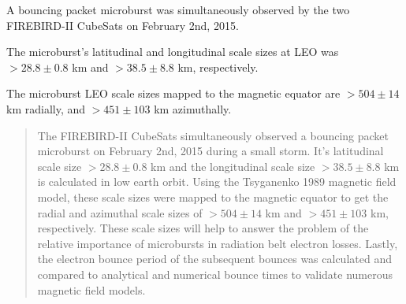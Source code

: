 \documentclass[draft,linenumbers]{agujournal}
\begin{document}





\begin{keypoints}
\item A bouncing packet microburst was simultaneously observed by the two FIREBIRD-II CubeSats on February 2nd, 2015.
\item The microburst's latitudinal and longitudinal scale sizes at LEO was $> 28.8 \pm 0.8$ km and $> 38.5 \pm 8.8$ km, respectively.
\item The microburst LEO scale sizes mapped to the magnetic equator are $ >504 \pm​ 14$ km radially, and $> 451 \pm 103$ km azimuthally.
\end{keypoints}

%
%


\begin{abstract}
The FIREBIRD-II CubeSats simultaneously observed a bouncing packet microburst on February 2nd, 2015 during a small storm. It's latitudinal scale size $ > 28.8 \pm 0.8$ km and the longitudinal scale size $ > 38.5 \pm 8.8$ km is calculated in low earth orbit. Using the Tsyganenko 1989 magnetic field model, these scale sizes were mapped to the magnetic equator to get the radial and azimuthal scale sizes of $> 504 \pm​ 14$ km and $> 451 \pm 103$ km, respectively. These scale sizes will help to answer the problem of the relative importance of microbursts in radiation belt electron losses. Lastly, the electron bounce period of the subsequent bounces was calculated and compared to analytical and numerical bounce times to validate numerous magnetic field models.
\end{abstract}
\end{document}
